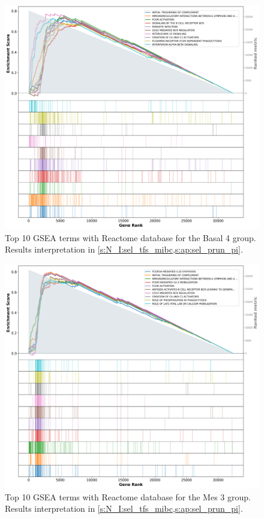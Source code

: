 \begin{figure}[!htb]
    \centering
    \includegraphics[width=\textwidth,keepaspectratio]{Sections/Network_I/Resources/selective_pruning/gsea/largeBasal_10_top_manTerms.png}
    \caption[Basal 4: GSEA top 10 Reactome terms]{Top 10 GSEA terms with Reactome database for the Basal 4 group. Results interpretation in \cref{s:N_I:sel_tfs_mibc,s:ap:sel_prun_pi}.}
    \label{fig:ap:gsea_largeBasal}
\end{figure}

\begin{figure}[!htb]
    \centering
    \includegraphics[width=\textwidth,keepaspectratio]{Sections/Network_I/Resources/selective_pruning/gsea/mesLike_10_top_manTerms.png}
    \caption[Mes 3: GSEA top 10 Reactome terms]{Top 10 GSEA terms with Reactome database for the Mes 3 group. Results interpretation in \cref{s:N_I:sel_tfs_mibc,s:ap:sel_prun_pi}.}
    \label{fig:ap:gsea_mesLike}
\end{figure}


